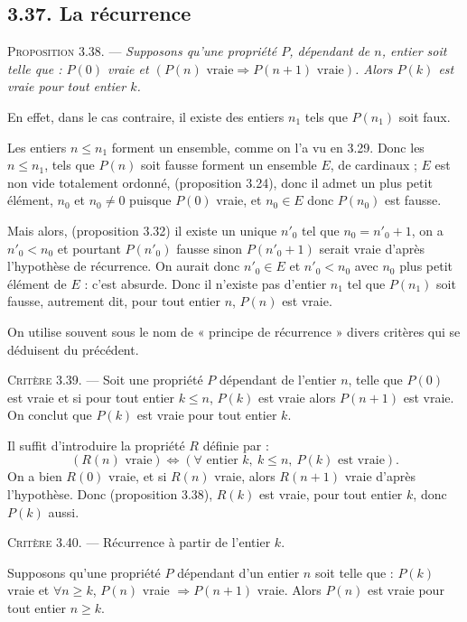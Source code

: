 \subsection*{3.37. La récurrence}

\medskip\noindent\textsc{Proposition 3.38.} --- \emph{Supposons qu'une propriété $P$, dépendant de $n$, entier soit telle que : $P(0)$ vraie et $(P(n)\text{ vraie}\Rightarrow P(n+1)\text{ vraie})$. Alors $P(k)$ est vraie pour tout entier $k$.}

En effet, dans le cas contraire, il existe des entiers $n_1$ tels que $P(n_1)$ soit faux.

Les entiers $n\le n_1$ forment un ensemble, comme on l'a vu en 3.29. Donc les $n\le n_1$, tels que $P(n)$ soit fausse forment un ensemble $E$, de cardinaux ; $E$ est non vide totalement ordonné, (proposition 3.24), donc il admet un plus petit élément, $n_0$ et $n_0\ne0$ puisque $P(0)$ vraie, et $n_0\in E$ donc $P(n_0)$ est fausse.

Mais alors, (proposition 3.32) il existe un unique $n'_0$ tel que $n_0=n'_0+1$, on a $n'_0<n_0$ et pourtant $P(n'_0)$ fausse sinon $P(n'_0+1)$ serait vraie d'après l'hypothèse de récurrence. On aurait donc $n'_0\in E$ et $n'_0<n_0$ avec $n_0$ plus petit élément de $E$ : c'est absurde. Donc il n'existe pas d'entier $n_1$ tel que $P(n_1)$ soit fausse, autrement dit, pour tout entier $n$, $P(n)$ est vraie. \bookend

On utilise souvent sous le nom de « principe de récurrence » divers critères qui se déduisent du précédent.

\medskip\noindent\textsc{Critère 3.39.} --- Soit une propriété $P$ dépendant de l'entier $n$, telle que $P(0)$ est vraie et si pour tout entier $k\le n$, $P(k)$ est vraie alors $P(n+1)$ est vraie. On conclut que $P(k)$ est vraie pour tout entier $k$.

Il suffit d'introduire la propriété $R$ définie par :
\[
(R(n)\text{ vraie})\Leftrightarrow(\forall\text{ entier }k,\ k\le n,\ P(k)\text{ est vraie}).
\]
On a bien $R(0)$ vraie, et si $R(n)$ vraie, alors $R(n+1)$ vraie d'après l'hypothèse. Donc (proposition 3.38), $R(k)$ est vraie, pour tout entier $k$, donc $P(k)$ aussi. \bookend

\medskip\noindent\textsc{Critère 3.40.} --- Récurrence à partir de l'entier $k$.

Supposons qu'une propriété $P$ dépendant d'un entier $n$ soit telle que : $P(k)$ vraie et $\forall n\ge k$, $P(n)$ vraie $\Rightarrow P(n+1)$ vraie. Alors $P(n)$ est vraie pour tout entier $n\ge k$.

